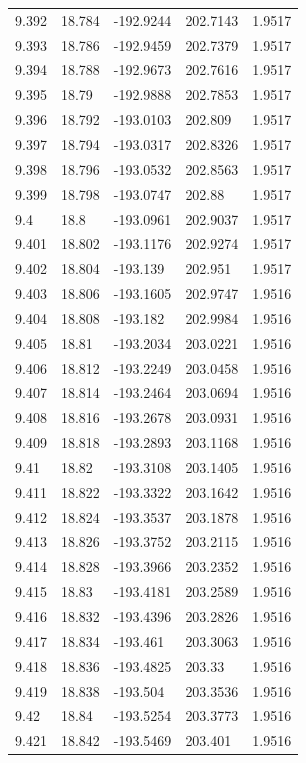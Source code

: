 \begin{tabular}{lllll}
9.392 & 18.784 & -192.9244 & 202.7143 & 1.9517 \\
9.393 & 18.786 & -192.9459 & 202.7379 & 1.9517 \\
9.394 & 18.788 & -192.9673 & 202.7616 & 1.9517 \\
9.395 & 18.79 & -192.9888 & 202.7853 & 1.9517 \\
9.396 & 18.792 & -193.0103 & 202.809 & 1.9517 \\
9.397 & 18.794 & -193.0317 & 202.8326 & 1.9517 \\
9.398 & 18.796 & -193.0532 & 202.8563 & 1.9517 \\
9.399 & 18.798 & -193.0747 & 202.88 & 1.9517 \\
9.4 & 18.8 & -193.0961 & 202.9037 & 1.9517 \\
9.401 & 18.802 & -193.1176 & 202.9274 & 1.9517 \\
9.402 & 18.804 & -193.139 & 202.951 & 1.9517 \\
9.403 & 18.806 & -193.1605 & 202.9747 & 1.9516 \\
9.404 & 18.808 & -193.182 & 202.9984 & 1.9516 \\
9.405 & 18.81 & -193.2034 & 203.0221 & 1.9516 \\
9.406 & 18.812 & -193.2249 & 203.0458 & 1.9516 \\
9.407 & 18.814 & -193.2464 & 203.0694 & 1.9516 \\
9.408 & 18.816 & -193.2678 & 203.0931 & 1.9516 \\
9.409 & 18.818 & -193.2893 & 203.1168 & 1.9516 \\
9.41 & 18.82 & -193.3108 & 203.1405 & 1.9516 \\
9.411 & 18.822 & -193.3322 & 203.1642 & 1.9516 \\
9.412 & 18.824 & -193.3537 & 203.1878 & 1.9516 \\
9.413 & 18.826 & -193.3752 & 203.2115 & 1.9516 \\
9.414 & 18.828 & -193.3966 & 203.2352 & 1.9516 \\
9.415 & 18.83 & -193.4181 & 203.2589 & 1.9516 \\
9.416 & 18.832 & -193.4396 & 203.2826 & 1.9516 \\
9.417 & 18.834 & -193.461 & 203.3063 & 1.9516 \\
9.418 & 18.836 & -193.4825 & 203.33 & 1.9516 \\
9.419 & 18.838 & -193.504 & 203.3536 & 1.9516 \\
9.42 & 18.84 & -193.5254 & 203.3773 & 1.9516 \\
9.421 & 18.842 & -193.5469 & 203.401 & 1.9516 \\

\end{tabular}
